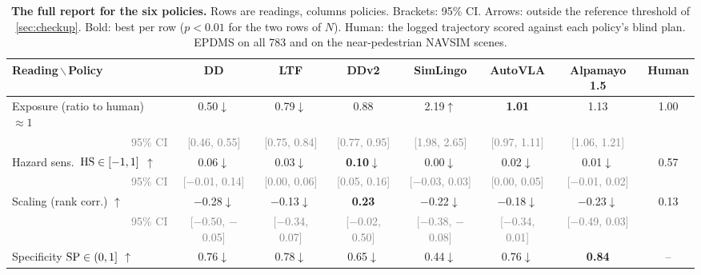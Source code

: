\begin{table}[t]
\centering
\caption{\textbf{The full report for the six policies.} Rows are readings, columns policies. Brackets: 95\% CI. Arrows: outside the reference threshold of \cref{sec:checkup}. Bold: best per row ($p<0.01$ for the two rows of $N$). Human: the logged trajectory scored against each policy's blind plan. EPDMS on all 783 and on the \NumNclose{} near-pedestrian NAVSIM scenes.}
\label{tab:report}
\footnotesize
\setlength{\tabcolsep}{4pt}
\begin{tabular}{@{}lccccccc@{}}
\toprule
Reading\,$\backslash$\,Policy & DD & LTF & DDv2 & SimLingo & AutoVLA & Alpamayo 1.5 & Human \\
\midrule
Exposure (ratio to human) $\approx1$ & 0.50$\downarrow$ & 0.79$\downarrow$ & 0.88 & 2.19$\uparrow$ & \textbf{1.01} & 1.13 & 1.00 \\
\multicolumn{1}{r}{\textcolor{gray}{\scriptsize 95\% CI}} & \textcolor{gray}{\scriptsize[0.46, 0.55]} & \textcolor{gray}{\scriptsize[0.75, 0.84]} & \textcolor{gray}{\scriptsize[0.77, 0.95]} & \textcolor{gray}{\scriptsize[1.98, 2.65]} & \textcolor{gray}{\scriptsize[0.97, 1.11]} & \textcolor{gray}{\scriptsize[1.06, 1.21]} & \\[-1pt]
Hazard sens.\ $\mathrm{HS}\in[-1,1]$ $\uparrow$ & 0.06$\downarrow$ & 0.03$\downarrow$ & \textbf{0.10$\downarrow$} & 0.00$\downarrow$ & 0.02$\downarrow$ & 0.01$\downarrow$ & 0.57 \\
\multicolumn{1}{r}{\textcolor{gray}{\scriptsize 95\% CI}} & \textcolor{gray}{\scriptsize[$-$0.01, 0.14]} & \textcolor{gray}{\scriptsize[0.00, 0.06]} & \textcolor{gray}{\scriptsize[0.05, 0.16]} & \textcolor{gray}{\scriptsize[$-$0.03, 0.03]} & \textcolor{gray}{\scriptsize[0.00, 0.05]} & \textcolor{gray}{\scriptsize[$-$0.01, 0.02]} & \\[-1pt]
Scaling (rank corr.) $\uparrow$ & $-$0.28$\downarrow$ & $-$0.13$\downarrow$ & \textbf{0.23} & $-$0.22$\downarrow$ & $-$0.18$\downarrow$ & $-$0.23$\downarrow$ & 0.13 \\
\multicolumn{1}{r}{\textcolor{gray}{\scriptsize 95\% CI}} & \textcolor{gray}{\scriptsize[$-$0.50, $-$0.05]} & \textcolor{gray}{\scriptsize[$-$0.34, 0.07]} & \textcolor{gray}{\scriptsize[$-$0.02, 0.50]} & \textcolor{gray}{\scriptsize[$-$0.38, $-$0.08]} & \textcolor{gray}{\scriptsize[$-$0.34, 0.01]} & \textcolor{gray}{\scriptsize[$-$0.49, 0.03]} & \\[-1pt]
Specificity $\mathrm{SP}\in(0,1]$ $\uparrow$ & 0.76$\downarrow$ & 0.78$\downarrow$ & 0.65$\downarrow$ & 0.44$\downarrow$ & 0.76$\downarrow$ & \textbf{0.84} & -- \\

\end{tabular}
\end{table}
